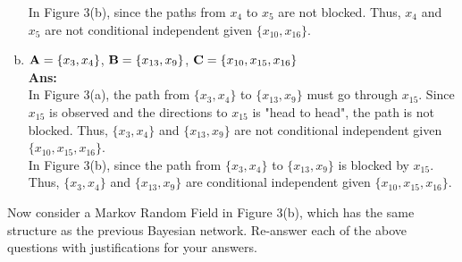 \documentclass[11pt]{article}
\begin{document}
\begin{enumerate}[a.]
In Figure 3(b), since the paths from $x_4$ to $x_5$ are not blocked. Thus, $x_4$ and $x_5$ are not conditional independent given $\{x_{10},x_{16}\}$.
%
\item ${\bf A} = \{x_3, x_4\}$, ${\bf B} = \{x_{13},x_9\}$, ${\bf C} = \{x_{10},x_{15},x_{16}\}$\\
\textbf{Ans:}\\
In Figure 3(a), the path from $\{x_3, x_4\}$ to $\{x_{13},x_9\}$ must go through $x_{15}$. Since $x_{15}$ is observed and the directions to $x_{15}$ is "head to head", the path is not blocked. Thus, $\{x_3, x_4\}$ and $\{x_{13},x_9\}$ are not conditional independent given $\{x_{10},x_{15},x_{16}\}$.\\

In Figure 3(b), since the path from $\{x_3, x_4\}$ to $\{x_{13},x_9\}$ is blocked by $x_{15}$. Thus, $\{x_3, x_4\}$ and $\{x_{13},x_9\}$ are conditional independent given $\{x_{10},x_{15},x_{16}\}$.
\end{enumerate}
Now consider a Markov Random Field in Figure 3(b), which has the same structure as the previous Bayesian network.  Re-answer each of the above questions with justifications for your answers.
\end{document}
